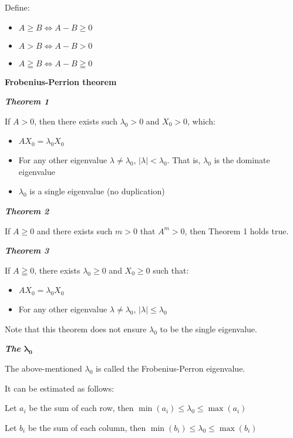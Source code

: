 \documentclass{article}
\newcommand{\bigtitle}[1]{
	\noindent
	\textbf{#1}
}
\newcommand{\smalltitle}[1]{
	\noindent
	\textbf{\textit{#1}}
}
\begin{document}
\begin{spacing}{1.2}
Define:

\begin{itemize}
	\item $A \geq B \Leftrightarrow A-B \geq 0$
	\item $A>B \Leftrightarrow A-B>0$
	\item $A \geqq B \Leftrightarrow A-B \geqq 0$
\end{itemize}


\bigtitle{Frobenius-Perrion theorem}

\smalltitle{Theorem 1}

If $A>0$, then there exists such $\lambda_0 > 0$ and $X_0 > 0$, which:

\begin{itemize}
	\item $AX_0 = \lambda_0 X_0$
	\item For any other eigenvalue $\lambda \neq \lambda_0$, $|\lambda| < \lambda_0$. That is, $\lambda_0$ is the dominate eigenvalue
	\item $\lambda_0$ is a single eigenvalue (no duplication)
\end{itemize}

\smalltitle{Theorem 2}

If $A\geq 0$ and there exists such $m>0$ that $A^m > 0$, then Theorem 1 holds true.

\smalltitle{Theorem 3}

If $A\geqq 0$, there exists $\lambda_0 \geq 0$ and $X_0 \geq 0$ such that:

\begin{itemize}
	\item $AX_0 = \lambda_0 X_0$
	\item For any other eigenvalue $\lambda \neq \lambda_0$, $|\lambda| \leq \lambda_0$
\end{itemize}

Note that this theorem does not ensure $\lambda_0$ to be the single eigenvalue.

\smalltitle{The $\mathbf{\boldsymbol{\lambda}_0}$}

The above-mentioned $\lambda_0$ is called the Frobenius-Perron eigenvalue.

It can be estimated as follows:

Let $a_i$ be the sum of each row, then $\min(a_i) \leq \lambda_0 \leq \max(a_i)$

Let $b_i$ be the sum of each column, then $\min(b_i) \leq \lambda_0 \leq \max(b_i)$






\end{spacing}
\end{document}
